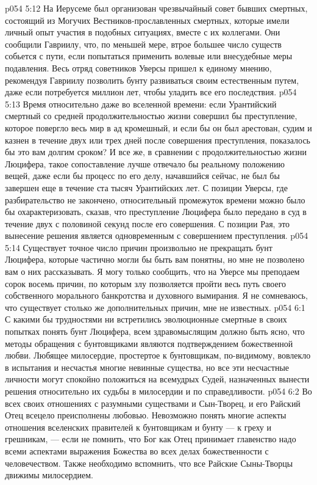 \vs p054 5:12 \pc {}\bibnobreakspace На Иерусеме был организован чрезвычайный совет бывших смертных, состоящий из Могучих Вестников\hyp{}прославленных смертных, которые имели личный опыт участия в подобных ситуациях, вместе с их коллегами. Они сообщили Гавриилу, что, по меньшей мере, втрое большее число существ собьется с пути, если попытаться применить волевые или внесудебные меры подавления. Весь отряд советников Уверсы пришел к единому мнению, рекомендуя Гавриилу позволить бунту развиваться своим естественным путем, даже если потребуется миллион лет, чтобы уладить все его последствия.
\vs p054 5:13 \pc {}\bibnobreakspace Время относительно даже во вселенной времени: если Урантийский смертный со средней продолжительностью жизни совершил бы преступление, которое повергло весь мир в ад кромешный, и если бы он был арестован, судим и казнен в течение двух или трех дней после совершения преступления, показалось бы это вам долгим сроком? И все же, в сравнении с продолжительностью жизни Люцифера, такое сопоставление лучше отвечало бы реальному положению вещей, даже если бы процесс по его делу, начавшийся сейчас, не был бы завершен еще в течение ста тысяч Урантийских лет. С позиции Уверсы, где разбирательство не закончено, относительный промежуток времени можно было бы охарактеризовать, сказав, что преступление Люцифера было передано в суд в течение двух с половиной секунд после его совершения. С позиции Рая, это вынесение решения является одновременным с совершением преступления.
\vs p054 5:14 \pc Существует точное число причин произвольно не прекращать бунт Люцифера, которые частично могли бы быть вам понятны, но мне не позволено вам о них рассказывать. Я могу только сообщить, что на Уверсе мы преподаем сорок восемь причин, по которым злу позволяется пройти весь путь своего собственного морального банкротства и духовного вымирания. Я не сомневаюсь, что существует столько же дополнительных причин, мне не известных.
\vs p054 6:1 С какими бы трудностями ни встретились эволюционные смертные в своих попытках понять бунт Люцифера, всем здравомыслящим должно быть ясно, что методы обращения с бунтовщиками являются подтверждением божественной любви. Любящее милосердие, простертое к бунтовщикам, по\hyp{}видимому, вовлекло в испытания и несчастья многие невинные существа, но все эти несчастные личности могут спокойно положиться на всемудрых Судей, назначенных вынести решения относительно их судьбы в милосердии и по справедливости.
\vs p054 6:2 Во всех своих отношениях с разумными существами и Сын\hyp{}Творец, и его Райский Отец всецело преисполнены любовью. Невозможно понять многие аспекты отношения вселенских правителей к бунтовщикам и бунту --- к греху и грешникам, --- если не помнить, что Бог как Отец принимает главенство надо всеми аспектами выражения Божества во всех делах божественности с человечеством. Также необходимо вспомнить, что все Райские Сыны\hyp{}Творцы движимы милосердием.
